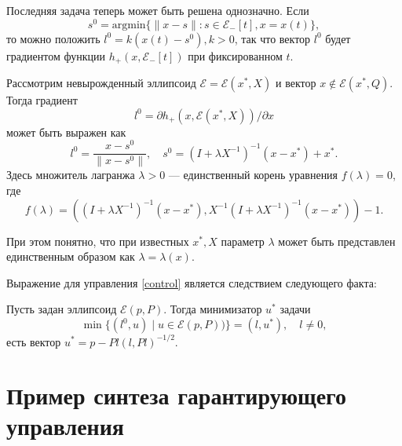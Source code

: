 Последняя задача теперь может быть решена однозначно. Если 
\begin{equation*}
    s^0 = \text{argmin}\{ \| x - s \| : s \in \mathcal{E}_-[t], x = x(t) \},
\end{equation*}
то можно положить \( l^0 = k(x(t) - s^0), k > 0 \), так что вектор \( l^0 \) будет градиентом функции
\( h_+(x, \mathcal{E}_-[t]) \) при фиксированном \( t \). 

\begin{lemma}
    Рассмотрим невырожденный эллипсоид \( \mathcal{E} = \mathcal{E}(x^*, X) \) и вектор \( x \notin 
     \mathcal{E}(x^*, Q). \) Тогда градиент
    \begin{equation*}
        l^0 = \partial h_+(x, \mathcal{E}(x^*, X)) / \partial x
    \end{equation*}
    может быть выражен как 
    \begin{equation*}
        l^0 = \frac{x - s^0}{\| x - s^0 \|}, \quad s^0 = (I + \lambda X^{-1})^{-1}(x - x^*) + x^*.
    \end{equation*}
    Здесь множитель лагранжа \( \lambda > 0 \) --- единственный корень уравнения \( f(\lambda) = 0 \),
    где
    \begin{equation*}
        f(\lambda) = ((I + \lambda X^{-1})^{-1}(x - x^*), X^{-1}(I + \lambda X^{-1})^{-1}(x - x^*)) - 1.
    \end{equation*}
\end{lemma}

При этом понятно, что при известных \( x^*, X \) параметр \( \lambda \) может быть представлен 
 единственным образом как \( \lambda = \lambda(x) \).

Выражение для управления \eqref{control} является следствием следующего факта:
\begin{lemma}
    Пусть задан эллипсоид \( \mathcal{E}(p, P) \). Тогда минимизатор \( u^* \) задачи
    \begin{equation*}
        \min\{ (l^0, u) \mid u \in \mathcal{E}(p, P)) \} = (l, u^*), \quad l \ne 0, 
    \end{equation*}
    есть вектор \( u^* = p - Pl(l, Pl)^{-1/2} \).
\end{lemma}

\section{Пример синтеза гарантирующего управления}

